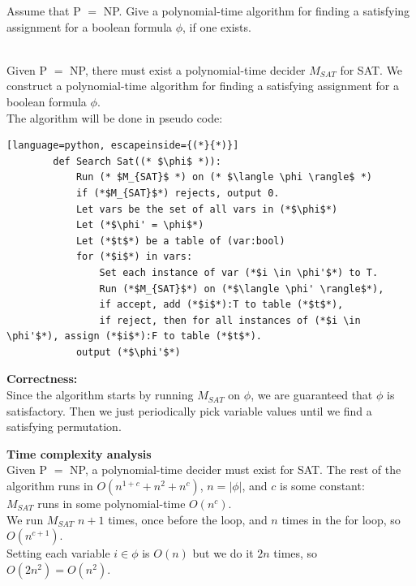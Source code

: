 \documentclass[a4paper,addpoints
	]{exam}
\begin{document}
\begin{questions}
\begin{solutionbox}{}
	\end{solutionbox}
	\pagebreak
	\question[15] Assume that P $=$ NP. Give a polynomial-time algorithm for finding a satisfying assignment for a boolean formula $\phi$, if one exists.
	\begin{solutionbox}{}\\
		Given P $=$ NP, there must exist a polynomial-time decider $M_{SAT}$ for SAT. We construct a polynomial-time algorithm for finding a satisfying assignment for a boolean formula $\phi$. \\ 
		The algorithm will be done in pseudo code:
		\lstset{style=mystyle}
		\begin{lstlisting}[language=python, escapeinside={(*}{*)}]
		def Search Sat((* $\phi$ *)):
		    Run (* $M_{SAT}$ *) on (* $\langle \phi \rangle$ *)
		    if (*$M_{SAT}$*) rejects, output 0.
		    Let vars be the set of all vars in (*$\phi$*)
		    Let (*$\phi' = \phi$*) 
		    Let (*$t$*) be a table of (var:bool)
		    for (*$i$*) in vars: 
		        Set each instance of var (*$i \in \phi'$*) to T. 
		        Run (*$M_{SAT}$*) on (*$\langle \phi' \rangle$*), 
		        if accept, add (*$i$*):T to table (*$t$*),
		        if reject, then for all instances of (*$i \in \phi'$*), assign (*$i$*):F to table (*$t$*). 
		    output (*$\phi'$*)
		\end{lstlisting} 

		\vspace{2em}


		\textbf{\large Correctness:} \\ 
		Since the algorithm starts by running $M_{SAT}$ on $\phi$, we are guaranteed that $\phi$ is satisfactory.
		Then we just periodically pick variable values until we find a satisfying permutation.
		
		\vspace{2em}

		\textbf{\large Time complexity analysis} \\  
		Given P $=$ NP, a polynomial-time decider must exist for SAT. The rest of the algorithm runs in $O(n^{1+c} + n^2 + n^c)$, $n = |\phi|$, and $c$ is some constant: \\
		$M_{SAT}$ runs in some polynomial-time $O(n^c)$. \\
		We run $M_{SAT}$ $n+1$ times, once before the loop, and $n$ times in the for loop, so $O(n^{c+1})$. \\
		Setting each variable $i \in \phi$ is $O(n)$ but we do it $2n$ times, so $O(2n^2) = O(n^2)$.
	\end{solutionbox}
\end{questions}
\pagebreak
\end{document}
